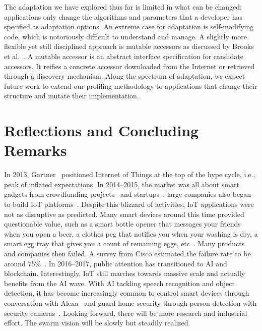 \documentclass[thesis.tex]{subfiles}
\begin{document}
 The adaptation we have explored thus far is
limited in what can be changed: applications only change the algorithms and
parameters that a developer has specified as adaptation options. An extreme case
for adaptation is self-modifying code, which is notoriously difficult to
understand and manage. A slightly more flexible yet still disciplined approach
is mutable accessors as discussed by Brooks et al.~\cite{brooks2018component}. A
mutable accessor is an abstract interface specification for candidate
accessors. It reifies a concrete accessor downloaded from the Internet or
retrieved through a discovery mechanism. Along the spectrum of adaptation, we
expect future work to extend our profiling methodology to applications that
change their structure and mutate their implementation.

\section{Reflections and Concluding Remarks}
\label{sec:conclusions}

In 2013, Gartner~\cite{middleton2013forecast} positioned Internet of Things at
the top of the hype cycle, i.e., peak of inflated expectations. In 2014--2015,
the market was all about smart gadgets from crowdfunding
projects~\cite{kickstarter} and startups~\cite{fitbit}; large companies also
began to build IoT platforms~\cite{sami, awsiot}. Despite this blizzard of
activities, IoT applications were not as disruptive as predicted. Many smart
devices around this time provided questionable value, such as a smart bottle
opener that messages your friends when you open a beer, a clothes peg that
notifies you when your washing is dry, a smart egg tray that gives you a count
of remaining eggs, etc~\cite{hartmann2016societal}. Many products and companies
then failed. A survey from Cisco estimated the failure rate to be around
75\%~\cite{cisco2017journey}. In 2016--2017, public attention has transitioned
to AI and blockchain. Interestingly, IoT still marches towards massive scale and
actually benefits from the AI wave. With AI tackling speech recognition and
object detection, it has become increasingly common to control smart devices
through conversation with Alexa~\cite{alexa} and guard home security through
person detection with security cameras~\cite{dropcam}. Looking forward, there
will be more research and industrial effort. The swarm vision will be slowly but
steadily realized.
\end{document}
